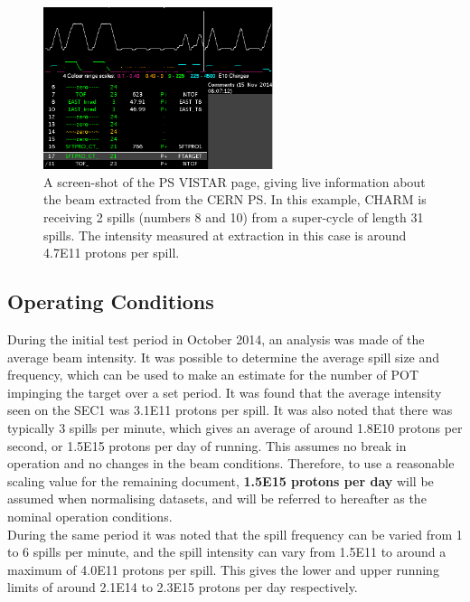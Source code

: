 \begin{figure}[!ht]
	\centering
	\includegraphics[width=0.6\textwidth]{./images/vistar_example}
	\caption{A screen-shot of the PS VISTAR page, giving live information about the beam extracted from the CERN PS. In this example, CHARM is receiving 2 spills (numbers 8 and 10) from a super-cycle of length 31 spills. The intensity measured at extraction in this case is around 4.7E11 protons per spill.}
	\label{fig:ps_vista}
\end{figure}

\subsection{Operating Conditions}

During the initial test period in October 2014, an analysis was made of the average beam intensity. It was possible to determine the average spill size and frequency, which can be used to make an estimate for the number of POT impinging the target over a set period. It was found that the average intensity seen on the SEC1 was 3.1E11 protons per spill. It was also noted that there was typically 3 spills per minute, which gives an average of around 1.8E10 protons per second, or 1.5E15 protons per day of running. This assumes no break in operation and no changes in the beam conditions. Therefore, to use a reasonable scaling value for the remaining document, \textbf{1.5E15 protons per day} will be assumed when normalising datasets, and will be referred to hereafter as the nominal operation conditions. \\

During the same period it was noted that the spill frequency can be varied from 1 to 6 spills per minute, and the spill intensity can vary from 1.5E11 to around a maximum of 4.0E11 protons per spill. This gives the lower and upper running limits of around 2.1E14 to 2.3E15 protons per day respectively. \\

